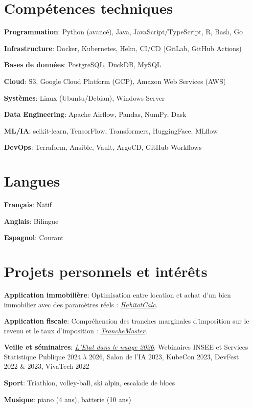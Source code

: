 \documentclass[a4paper,10pt]{article}
\newcommand{\resumeItem}[2]{
  \item\small{
    \textbf{#1}{: #2\vspace{-0.8pt}}
  }
}
\newcommand{\resumeSubItem}[2]{
    \small{\resumeItem{#1}{#2}\vspace{-4pt}}
	
}
\newcommand{\resumeSubHeadingListStart}{\begin{itemize}[leftmargin=*]}
\newcommand{\resumeSubHeadingListEnd}{\end{itemize}}
\begin{document}
\begin{minipage}[t]{0.65\linewidth}
    \section{Comp\'etences techniques}
    \resumeSubHeadingListStart
    \resumeSubItem{Programmation}{Python (avanc\'e), Java, JavaScript/TypeScript, R, Bash, Go}
    \resumeSubItem{Infrastructure}{Docker, Kubernetes, Helm, CI/CD (GitLab, GitHub Actions)}
    \resumeSubItem{Bases de donn\'ees}{PostgreSQL, DuckDB, MySQL}
    \resumeSubItem{Cloud}{S3, Google Cloud Platform (GCP), Amazon Web Services (AWS)}
    \resumeSubItem{Syst\`emes}{Linux (Ubuntu/Debian), Windows Server}
    \resumeSubItem{Data Engineering}{Apache Airflow, Pandas, NumPy, Dask}
    \resumeSubItem{ML/IA}{scikit-learn, TensorFlow, Transformers, HuggingFace, MLflow}
    \resumeSubItem{DevOps}{Terraform, Ansible, Vault, ArgoCD, GitHub Workflows}
    \resumeSubHeadingListEnd
    \end{minipage}
\hfill
\begin{minipage}[t]{0.3\linewidth}
    \section{Langues}
    \resumeSubHeadingListStart
    \resumeSubItem{Fran\c{c}ais}{Natif}
    \resumeSubItem{Anglais}{Bilingue}
    \resumeSubItem{Espagnol}{Courant}
    \resumeSubHeadingListEnd
\end{minipage}



\section{Projets personnels et int\'er\^ets}
\vspace{0.5mm}
\begin{minipage}[t]{0.9865\textwidth}
\resumeSubHeadingListStart
  \resumeSubItem{Application immobili\`ere}{Optimisation entre location et achat d'un bien immobilier avec des param\`etres r\'eels : \href{https://odysseu.github.io/HabitatCalc/}{\textit{HabitatCalc}}.} 
  \resumeSubItem{Application fiscale}{Compr\'ehension des tranches marginales d'imposition sur le revenu et le taux d'imposition : \href{https://odysseu.github.io/TrancheMaster/}{\textit{TrancheMaster}}.} 
  \resumeSubItem{Veille et s\'eminaires}{\href{https://www.numerique.gouv.fr/agenda/etat-dans-le-nuage-2026/}{\textit{L'Etat dans le nuage 2026}}, Webinaires INSEE et Services Statistique Publique 2024 \`a 2026, Salon de l'IA 2023, KubeCon 2023, DevFest 2022 \& 2023, VivaTech 2022}
  \resumeSubItem{Sport}{Triathlon, volley-ball, ski alpin, escalade de blocs}
  \resumeSubItem{Musique}{piano (4 ans), batterie (10 ans)}
\resumeSubHeadingListEnd
\end{minipage}


\end{document}
